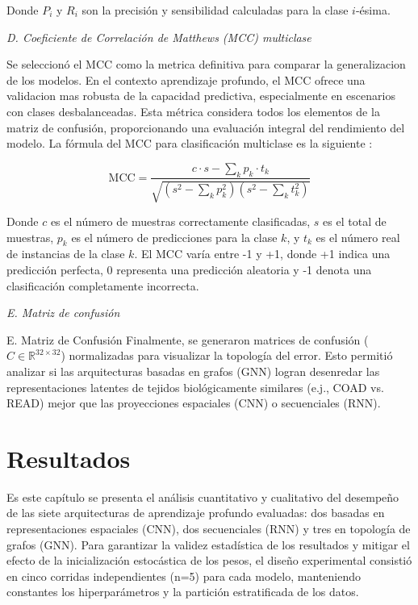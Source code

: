 \documentclass[preprint,number]{elsarticle}
\begin{document}
Donde $P_i$ y $R_i$ son la precisión y sensibilidad calculadas para la clase $i$-ésima.

\textit{D. Coeficiente de Correlación de Matthews (MCC) multiclase}

Se seleccionó el MCC como la metrica definitiva para comparar la generalizacion de los modelos. En el contexto aprendizaje profundo, el MCC ofrece una validacion mas robusta de la capacidad predictiva, especialmente en escenarios con clases desbalanceadas. Esta métrica considera todos los elementos de la matriz de confusión, proporcionando una evaluación integral del rendimiento del modelo. La fórmula del MCC para clasificación multiclase es la siguiente \cite{gorodkin2004comparing}:

\begin{equation*}
    \text{MCC} = \frac{c \cdot s - \sum_{k} p_k \cdot t_k}{\sqrt{(s^2 - \sum_{k} p_k^2)(s^2 - \sum_{k} t_k^2)}}
\end{equation*}

Donde $c$ es el número de muestras correctamente clasificadas, $s$ es el total de muestras, $p_k$ es el número de predicciones para la clase $k$, y $t_k$ es el número real de instancias de la clase $k$. El MCC varía entre -1 y +1, donde +1 indica una predicción perfecta, 0 representa una predicción aleatoria y -1 denota una clasificación completamente incorrecta.

\textit{E. Matriz de confusión}

E. Matriz de Confusión
Finalmente, se generaron matrices de confusión ($C \in \mathbb{R}^{32 \times 32}$) normalizadas para visualizar la topología del error. Esto permitió analizar si las arquitecturas basadas en grafos (GNN) logran desenredar las representaciones latentes de tejidos biológicamente similares (e.j., COAD vs. READ) mejor que las proyecciones espaciales (CNN) o secuenciales (RNN).


\section{Resultados}
Es este capítulo se presenta el análisis cuantitativo y cualitativo del desempeño de las siete arquitecturas de aprendizaje profundo evaluadas: dos basadas en representaciones espaciales (CNN), dos secuenciales (RNN) y tres en topología de grafos (GNN). Para garantizar la validez estadística de los resultados y mitigar el efecto de la inicialización estocástica de los pesos, el diseño experimental consistió en cinco corridas independientes (n=5) para cada modelo, manteniendo constantes los hiperparámetros y la partición estratificada de los datos.
\end{document}
